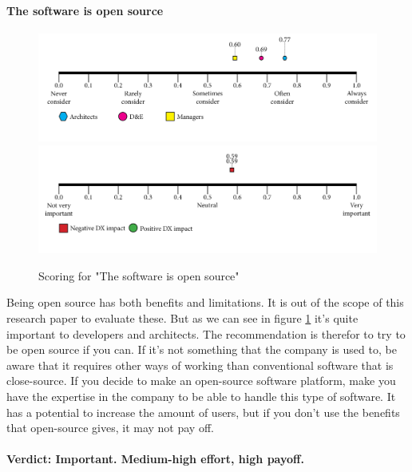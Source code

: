     \paragraph{The software is open source}
    \begin{figure}[H]
        \centering
        \includegraphics[width=\linewidth]{scorelines/aspect14.png}
        \includegraphics[width=\linewidth]{dxscorelines/dxaspect14.png}
        \caption{Scoring for "The software is open source"}
        \label{fig:aspect14}
    \end{figure}
    Being open source has both benefits and limitations. It is out of the scope of this research paper to evaluate these. But as we can see in figure \ref{fig:aspect14} it's quite important to developers and architects. The recommendation is therefor to try to be open source if you can. If it's not something that the company is used to, be aware that it requires other ways of working than conventional software that is close-source. If you decide to make an open-source software platform, make you have the expertise in the company to be able to handle this type of software. It has a potential to increase the amount of users, but if you don't use the benefits that open-source gives, it may not pay off. \\ \\
    \textbf{Verdict: Important. Medium-high effort, high payoff.}
    
